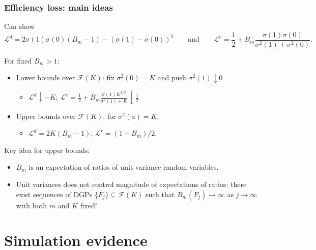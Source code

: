 \documentclass[aspectratio=169, 10pt]{beamer}
\theoremstyle{definition}
\theoremstyle{plain}
\def\calL{\mathcal{L}}
\def\calF{\mathcal{F}}
\begin{document}
\begin{frame}
\frametitle{Efficiency loss: main ideas}
Can show
\begin{equation*}
  \calL^{d} = 2 \sigma (1) \sigma (0) (B_{m} - 1) - (\sigma (1) - \sigma
  (0))^{2} \qquad \text{and} \qquad
  \calL^{r} = \frac{1}{2} + B_{m} \frac{\sigma (1) \sigma (0)}{\sigma^{2} (1) +
  \sigma^{2} (0)}.
\end{equation*}
\vfill
\pause

For fixed \(B_{m} > 1\):
\vfill
\begin{itemize}
  \item Lower bounds over \(\calF (K)\): fix \(\sigma^{2} (0) = K\) and push
    \(\sigma^{2} (1) \downarrow 0\)
    \begin{itemize}
      \item \(\calL^{d} \downarrow -K\); \(\calL^{r} = \frac{1}{2} + B_{m}
        \frac{\sigma (1) K^{1/2}}{\sigma^{2} (1) + K} \downarrow \frac{1}{2}\)
    \end{itemize}
    \vfill
  \item Upper bounds over \(\calF (K)\): for \(\sigma^{2} (a) = K\),
    \begin{itemize}
      \item \(\calL^{d} = 2 K (B_{m} - 1)\); \(\calL^{r} = (1 + B_{m}) / 2\).
    \end{itemize}
\end{itemize}
\vfill
\pause

Key idea for upper bounds:
\vfill
\begin{itemize}
  \item \(B_{m}\) is an expectation of ratios of unit variance random variables.
    \vfill
  \item \label{itm--efficiency-loss-proof-sketch}
    Unit variances does not control magnitude of expectations of ratios:
    there exist sequences of DGPs \(\{F_{j}\} \subseteq \calF (K)\) such that
    \(B_{m} (F_{j}) \to \infty\) as \(j \to \infty\) with both \(m\) and \(K\)
    fixed! \hyperlink{frm--prf--Bm-explodes-existence}{%
  }
\end{itemize}
\end{frame}

\section{Simulation evidence}
\end{document}
